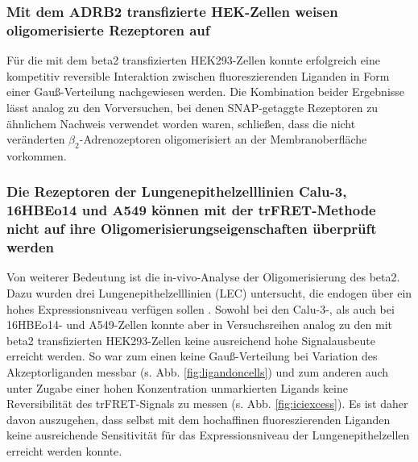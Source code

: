 \subsubsection{Mit dem ADRB2 transfizierte HEK-Zellen weisen oligomerisierte Rezeptoren auf}
Für die mit dem \gls{beta2} transfizierten HEK293-Zellen konnte erfolgreich eine kompetitiv reversible Interaktion zwischen fluoreszierenden Liganden in Form einer Gauß-Verteilung nachgewiesen werden. Die Kombination beider Ergebnisse lässt analog zu den Vorversuchen, bei denen SNAP-getaggte Rezeptoren zu ähnlichem Nachweis verwendet worden waren, schließen, dass die nicht veränderten $\beta_2$-Adrenozeptoren oligomerisiert an der Membranoberfläche vorkommen. 

\subsubsection{Die Rezeptoren der Lungenepithelzelllinien Calu-3, 16HBEo14 und A549 können mit der trFRET-Methode nicht auf ihre Oligomerisierungseigenschaften überprüft werden}
Von weiterer Bedeutung ist die in-vivo-Analyse der Oligomerisierung des \gls{beta2}. Dazu wurden drei Lungenepithelzelllinien (LEC) untersucht, die endogen über ein hohes Expressionsniveau verfügen sollen \parencite{Abraham2004}. Sowohl bei den Calu-3-, als auch bei 16HBEo14- und A549-Zellen konnte aber in Versuchsreihen analog zu den mit \gls{beta2} transfizierten HEK293-Zellen keine ausreichend hohe Signalausbeute erreicht werden. So war zum einen keine Gauß-Verteilung  bei Variation des Akzeptorliganden messbar (s. Abb. \ref{fig:ligandoncells}) und zum anderen auch unter Zugabe einer hohen Konzentration unmarkierten Ligands keine Reversibilität des trFRET-Signals zu messen (s. Abb. \ref{fig:iciexcess}). Es ist daher davon auszugehen, dass selbst mit dem hochaffinen fluoreszierenden Liganden keine ausreichende Sensitivität für das Expressionsniveau der Lungenepithelzellen erreicht werden konnte.

